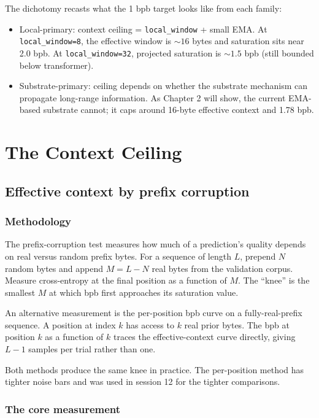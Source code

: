 \documentclass[11pt,openany]{book}
\begin{document}
The dichotomy recasts what the 1 bpb target looks like from each family:

\begin{itemize}
  \item Local-primary: context ceiling = \texttt{local\_window} + small EMA.
  At \texttt{local\_window=8}, the effective window is $\sim 16$ bytes and
  saturation sits near 2.0 bpb. At \texttt{local\_window=32}, projected
  saturation is $\sim 1.5$ bpb (still bounded below transformer).
  \item Substrate-primary: ceiling depends on whether the substrate
  mechanism can propagate long-range information. As Chapter 2 will show,
  the current EMA-based substrate cannot; it caps around 16-byte effective
  context and 1.78 bpb.
\end{itemize}

\part{The Context Ceiling}

\chapter{Effective context by prefix corruption}
\label{ch:context-ceiling}

\section{Methodology}

The prefix-corruption test measures how much of a prediction's quality
depends on real versus random prefix bytes. For a sequence of length
$L$, prepend $N$ random bytes and append $M = L - N$ real bytes from the
validation corpus. Measure cross-entropy at the final position as a function
of $M$. The ``knee'' is the smallest $M$ at which bpb first approaches its
saturation value.

An alternative measurement is the per-position bpb curve on a
fully-real-prefix sequence. A position at index $k$ has access to $k$ real
prior bytes. The bpb at position $k$ as a function of $k$ traces the
effective-context curve directly, giving $L-1$ samples per trial rather than
one.

Both methods produce the same knee in practice. The per-position method has
tighter noise bars and was used in session 12 for the tighter comparisons.

\section{The core measurement}
\end{document}
